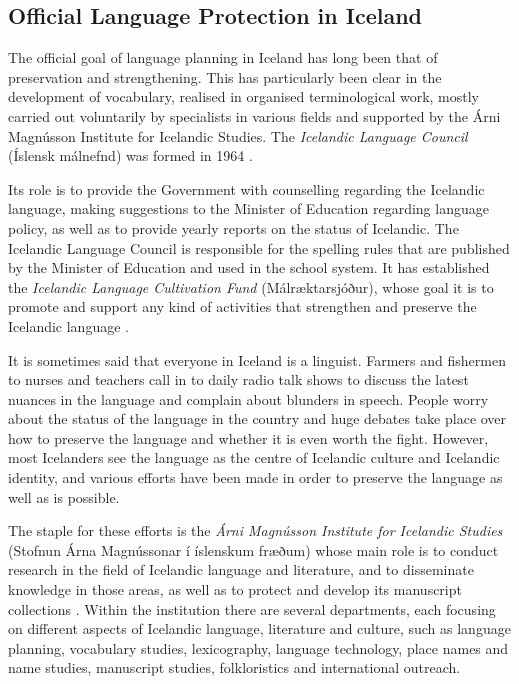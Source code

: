 \begin{multicols}{2}
\subsection{Official Language Protection in Iceland}

The official goal of language planning in Iceland has long been that of preservation and strengthening. This has particularly been clear in the development of vocabulary, realised in organised terminological work, mostly carried out voluntarily by specialists in various fields and supported by the Árni Magnússon Institute for Icelandic Studies. The \textit{Icelandic Language Council} (Íslensk málnefnd) was formed in 1964 \cite{arn1}.  


Its role is to provide the Government with counselling regarding the Icelandic language, making suggestions to the Minister of Education regarding language policy, as well as to provide yearly reports on the status of Icelandic. 
The Icelandic Language Council is responsible for the spelling rules that are published by the Minister of Education and used in the school system. It has established the \textit{Icelandic Language Cultivation Fund} (Mál\-ræktar\-sjóður), whose goal it is to promote and support any kind of activities that strengthen and preserve the Icelandic language \cite{arn2}.

It is sometimes said that everyone in Iceland is a linguist. Farmers and fishermen to nurses and teachers call in to daily radio talk shows to discuss the latest nuances in the language and complain about blunders in speech. People worry about the status of the language in the country and huge debates take place over how to preserve the language and whether it is even worth the fight. However, most Icelanders see the language as the centre of Icelandic culture and Icelandic identity, and various efforts have been made in order to preserve the language as well as is possible.

The staple for these efforts is the \textit{Árni Magnússon Institute for Icelandic Studies} (Stofnun Árna Magnússonar í íslenskum fræðum) whose main role is to conduct research in the field of Icelandic language and literature, and to disseminate knowledge in those areas, as well as to protect and develop its manuscript collections \cite{alt2}.  Within the institution there are several departments, each focusing on different aspects of Icelandic language, literature and culture, such as language planning, vocabulary studies, lexicography, language technology, place names and name studies, manuscript studies, folkloristics and international outreach.


\end{multicols}
